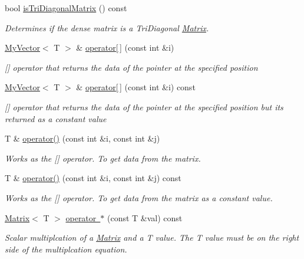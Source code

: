 \begin{DoxyCompactItemize}
bool \mbox{\hyperlink{class_matrix_a085b1801ea9d9b55eb5a3ca78bbda055}{is\+Tri\+Diagonal\+Matrix}} () const
\begin{DoxyCompactList}\small\item\em Determines if the dense matrix is a Tri\+Diagonal \mbox{\hyperlink{class_matrix}{Matrix}}. \end{DoxyCompactList}\item 
\mbox{\hyperlink{class_my_vector}{My\+Vector}}$<$ T $>$ \& \mbox{\hyperlink{class_matrix_aa9532c87a69bef256954e2309ca3fdd6}{operator\mbox{[}$\,$\mbox{]}}} (const int \&i)
\begin{DoxyCompactList}\small\item\em \mbox{[}\mbox{]} operator that returns the data of the pointer at the specified position \end{DoxyCompactList}\item 
\mbox{\hyperlink{class_my_vector}{My\+Vector}}$<$ T $>$ \& \mbox{\hyperlink{class_matrix_a56c7f18f272e74bee2b616eba702fc87}{operator\mbox{[}$\,$\mbox{]}}} (const int \&i) const
\begin{DoxyCompactList}\small\item\em \mbox{[}\mbox{]} operator that returns the data of the pointer at the specified position but its returned as a constant value \end{DoxyCompactList}\item 
T \& \mbox{\hyperlink{class_matrix_a685ee55a86c08533f9593247a6220a18}{operator()}} (const int \&i, const int \&j)
\begin{DoxyCompactList}\small\item\em Works as the \mbox{[}\mbox{]} operator. To get data from the matrix. \end{DoxyCompactList}\item 
T \& \mbox{\hyperlink{class_matrix_aabc9c2977b9bd176e17808e6bf96a69f}{operator()}} (const int \&i, const int \&j) const
\begin{DoxyCompactList}\small\item\em Works as the \mbox{[}\mbox{]} operator. To get data from the matrix as a constant value. \end{DoxyCompactList}\item 
\mbox{\hyperlink{class_matrix}{Matrix}}$<$ T $>$ \mbox{\hyperlink{class_matrix_a9b987f07fb3d4fcf2b038cbfd6615650}{operator $\ast$}} (const T \&val) const
\begin{DoxyCompactList}\small\item\em Scalar multiplcation of a \mbox{\hyperlink{class_matrix}{Matrix}} and a T value. The T value must be on the right side of the multiplcation equation. \end{DoxyCompactList}\item 

\end{DoxyCompactItemize}
